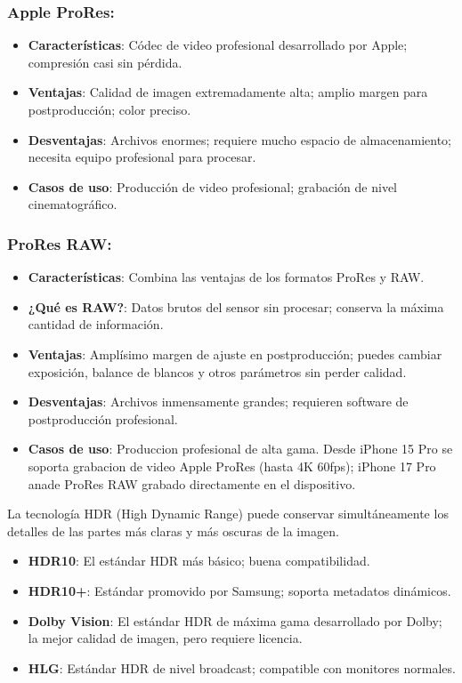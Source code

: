 \subsubsection*{Apple ProRes:}

\begin{itemize}
  \item \textbf{Características}: Códec de video profesional desarrollado por Apple; compresión casi sin pérdida.
  \item \textbf{Ventajas}: Calidad de imagen extremadamente alta; amplio margen para postproducción; color preciso.
  \item \textbf{Desventajas}: Archivos enormes; requiere mucho espacio de almacenamiento; necesita equipo profesional para procesar.
  \item \textbf{Casos de uso}: Producción de video profesional; grabación de nivel cinematográfico.
\end{itemize}

\subsubsection*{ProRes RAW:}

\begin{itemize}
  \item \textbf{Características}: Combina las ventajas de los formatos ProRes y RAW.
  \item \textbf{¿Qué es RAW?}: Datos brutos del sensor sin procesar; conserva la máxima cantidad de información.
  \item \textbf{Ventajas}: Amplísimo margen de ajuste en postproducción; puedes cambiar exposición, balance de blancos y otros parámetros sin perder calidad.
  \item \textbf{Desventajas}: Archivos inmensamente grandes; requieren software de postproducción profesional.
  \item \textbf{Casos de uso}: Produccion profesional de alta gama. Desde iPhone 15 Pro se soporta grabacion de video Apple ProRes (hasta 4K 60fps); iPhone 17 Pro anade ProRes RAW grabado directamente en el dispositivo.
\end{itemize}


La tecnología HDR (High Dynamic Range) puede conservar simultáneamente los detalles de las partes más claras y más oscuras de la imagen.

\begin{itemize}
  \item \textbf{HDR10}: El estándar HDR más básico; buena compatibilidad.
  \item \textbf{HDR10+}: Estándar promovido por Samsung; soporta metadatos dinámicos.
  \item \textbf{Dolby Vision}: El estándar HDR de máxima gama desarrollado por Dolby; la mejor calidad de imagen, pero requiere licencia.
  \item \textbf{HLG}: Estándar HDR de nivel broadcast; compatible con monitores normales.
\end{itemize}

